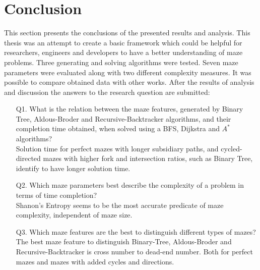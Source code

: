 \section{Conclusion}
This section presents the conclusions of the presented results and analysis. This thesis was an attempt to create a basic framework which could be helpful
for researchers, engineers and developers to have a better understanding of maze problems. Three generating and solving algorithms were tested. Seven 
maze parameters were evaluated along with two different complexity measures. It was possible to compare obtained data with other works. After the results of analysis and 
discussion the answers to the research question are submitted:
\begin{enumerate}
    \item [Q1.] What is the relation between the maze features, generated by Binary Tree, Aldous-Broder and Recursive-Backtracker algorithms,
     and their completion time obtained, when solved using a BFS, Dijkstra and $A^*$ algorithms?\\
     Solution time for perfect mazes with longer subsidiary paths, and cycled-directed mazes with higher fork and intersection ratios, such as Binary Tree,
     identify to have longer solution time.
    \item [Q2.] Which maze parameters best describe the complexity of a problem in terms of time completion?\\
    Shanon's Entropy seems to be the most accurate predicate of maze complexity, independent of maze size. 
    \item [Q3.] Which maze features are the best to distinguish different types of mazes?\\
    The best maze feature to distinguish Binary-Tree, Aldous-Broder and Recursive-Backtracker is cross number to dead-end number. Both 
    for perfect mazes and mazes with added cycles and directions.
\end{enumerate} 

